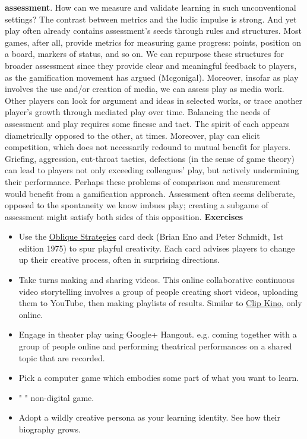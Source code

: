 \textbf{assessment}. How can we measure and validate learning in such
unconventional settings? The contrast between metrics and the ludic
impulse is strong. And yet play often already contains assessment's
seeds through rules and structures. Most games, after all, provide
metrics for measuring game progress: points, position on a board,
markers of status, and so on. We can repurpose these structures for
broader assessment since they provide clear and meaningful feedback to
players, as the gamification movement has argued (Mcgonigal). Moreover,
insofar as play involves the use and/or creation of media, we can assess
play as media work. Other players can look for argument and ideas in
selected works, or trace another player's growth through mediated play
over time. Balancing the needs of assessment and play requires some
finesse and tact. The spirit of each appears diametrically opposed to
the other, at times. Moreover, play can elicit competition, which does
not necessarily redound to mutual benefit for players. Griefing,
aggression, cut-throat tactics, defections (in the sense of game theory)
can lead to players not only exceeding colleagues' play, but actively
undermining their performance. Perhaps these problems of comparison and
measurement would benefit from a gamification approach. Assessment often
seems deliberate, opposed to the spontaneity we know imbues play;
creating a subgame of assessment might satisfy both sides of this
opposition. \textbf{Exercises}

\begin{itemize}
\item
  Use the \href{http://www.rtqe.net/ObliqueStrategies/}{Oblique
  Strategies} card deck (Brian Eno and Peter Schmidt, 1st edition 1975)
  to spur playful creativity. Each card advises players to change up
  their creative process, often in surprising directions.
\item
  Take turns making and sharing videos. This online collaborative
  continuous video storytelling involves a group of people creating
  short videos, uploading them to YouTube, then making playlists of
  results. Similar to \href{http://clipkino.info/}{Clip Kino}, only
  online.
\item
  Engage in theater play using Google+ Hangout. e.g. coming together
  with a group of people online and performing theatrical performances
  on a shared topic that are recorded.
\item
  Pick a computer game which embodies some part of what you want to
  learn.
\item
  " " non-digital game.
\item
  Adopt a wildly creative persona as your learning identity. See how
  their biography grows.
\end{itemize}
